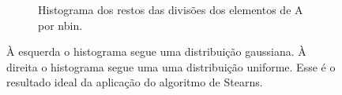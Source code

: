 \begin{figure}[ht]
\begin{subfigure}{.49\textwidth}
  \caption{Histograma dos restos das divisões dos elementos de A por nbin.}
  \label{fig:histao}
\end{subfigure}
\caption[Histogramas gerados pela aplicação do algoritmo de Stearns]{À esquerda
o histograma segue uma distribuição gaussiana.
À direita o histograma segue uma uma distribuição uniforme. Esse é o resultado ideal da
aplicação do algoritmo de Stearns.}
\label{fig:naoestacionariaeestacionaria}
\end{figure}
